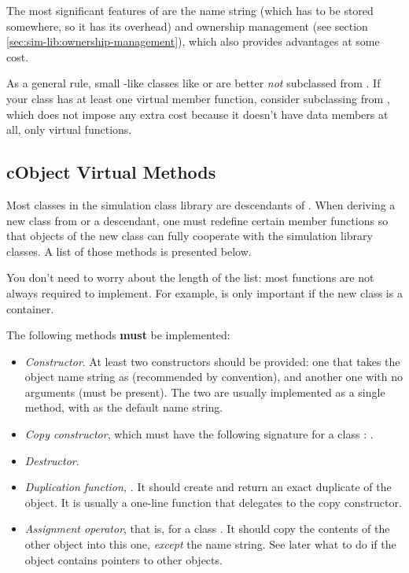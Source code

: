 The most significant features of  are
the name string (which has to be stored somewhere, so it has
its overhead) and ownership management (see section
\ref{sec:sim-lib:ownership-management}), which
also provides advantages at some cost.

As a general rule, small -like classes like  or
 are better \textit{not} subclassed from .
If your class has at least one virtual member function, consider
subclassing from , which does not impose any
extra cost because it doesn't have data members at all, only
virtual functions.


\subsection{cObject Virtual Methods}
\label{sec:sim-lib:cobject-virtual-methods}

Most classes in the simulation class library are descendants of
. When deriving a new class from 
or a  descendant, one must redefine certain member
functions so that objects of the new class can fully cooperate
with the simulation library classes. A list of those methods is
presented below.

\begin{note}
You don't need to worry about the length of the list: most functions
are not always required to implement. For example, 
is only important if the new class is a container.
\end{note}

The following methods \textbf{must} be implemented:

\begin{itemize}
  \item \textit{Constructor}. At least two constructors should be provided:
        one that takes the object name string as 
        (recommended by convention), and another one with no arguments
        (must be present). The two are usually implemented as a single
        method, with  as the default name string.
  \item \textit{Copy constructor}, which must have the following signature
        for a class : .
  \item \textit{Destructor}.
  \item \textit{Duplication function,} .
        It should create and return an exact duplicate of the object.
        It is usually a one-line function that delegates to the copy constructor.
  \item \textit{Assignment operator}, that is, 
        for a class . It should copy the contents of the other
        object into this one, \textit{except} the name string. See later what to do
        if the object contains pointers to other objects.
\end{itemize}

